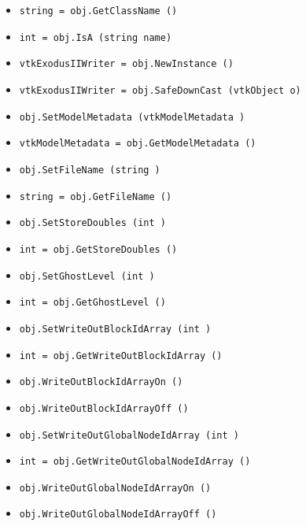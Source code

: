\begin{itemize}
\item  \verb|string = obj.GetClassName ()|

\item  \verb|int = obj.IsA (string name)|

\item  \verb|vtkExodusIIWriter = obj.NewInstance ()|

\item  \verb|vtkExodusIIWriter = obj.SafeDownCast (vtkObject o)|

\item  \verb|obj.SetModelMetadata (vtkModelMetadata )|

\item  \verb|vtkModelMetadata = obj.GetModelMetadata ()|

\item  \verb|obj.SetFileName (string )|

\item  \verb|string = obj.GetFileName ()|

\item  \verb|obj.SetStoreDoubles (int )|

\item  \verb|int = obj.GetStoreDoubles ()|

\item  \verb|obj.SetGhostLevel (int )|

\item  \verb|int = obj.GetGhostLevel ()|

\item  \verb|obj.SetWriteOutBlockIdArray (int )|

\item  \verb|int = obj.GetWriteOutBlockIdArray ()|

\item  \verb|obj.WriteOutBlockIdArrayOn ()|

\item  \verb|obj.WriteOutBlockIdArrayOff ()|

\item  \verb|obj.SetWriteOutGlobalNodeIdArray (int )|

\item  \verb|int = obj.GetWriteOutGlobalNodeIdArray ()|

\item  \verb|obj.WriteOutGlobalNodeIdArrayOn ()|

\item  \verb|obj.WriteOutGlobalNodeIdArrayOff ()|


\end{itemize}

